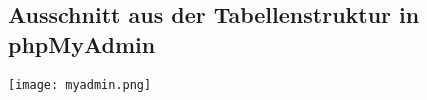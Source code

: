 \subsection{Ausschnitt aus der Tabellenstruktur in phpMyAdmin}
\label{app:phpmyadmin}
\begin{center}
\texttt{[image: myadmin.png]}
\end{center}